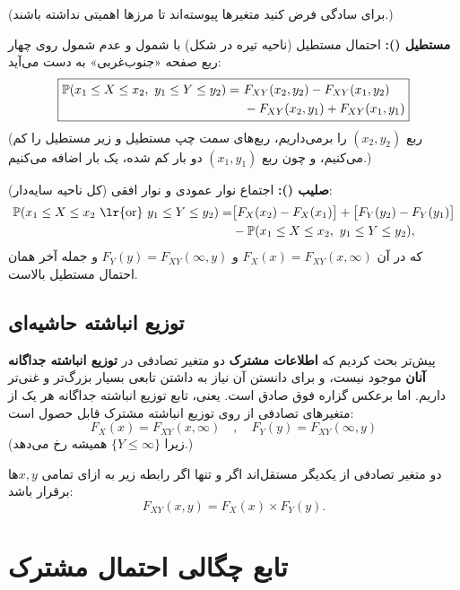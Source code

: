 \begin{question}[$\Prob(x_1\le X\le x_2\ ,\ y_1\le Y\le y_2)=\ ?$ و $\Prob(x_1\le X\le x_2\ \text{\lr{or}}\ y_1\le Y\le y_2)=\ ?$]
\begin{answer}
(برای سادگی فرض کنید متغیرها پیوسته‌اند تا مرزها اهمیتی نداشته باشند.)

\textbf{مستطیل ():} احتمال مستطیل (ناحیه تیره در شکل) با شمول و عدم شمول روی چهار ربع صفحه «جنوب‌غربی» به دست می‌آید:
\[
\boxed{\begin{aligned}\Prob(x_1\le X\le x_2,\ y_1\le Y\le y_2)=\ &F_{XY}(x_2,y_2)-F_{XY}(x_1,y_2)\\&-F_{XY}(x_2,y_1)+F_{XY}(x_1,y_1)\end{aligned}}
\]
(ربع $(x_2,y_2)$ را برمی‌داریم، ربع‌های سمت چپ مستطیل و زیر مستطیل را کم می‌کنیم، و چون ربع $(x_1,y_1)$ دو بار کم شده، یک بار اضافه می‌کنیم.)

\textbf{صلیب ():} اجتماع نوار عمودی و نوار افقی (کل ناحیه سایه‌دار):
\[
\begin{aligned}
\Prob(x_1\le X\le x_2\ \text{\lr{or}}\ y_1\le Y\le y_2)=&\big[F_X(x_2)-F_X(x_1)\big]+\big[F_Y(y_2)-F_Y(y_1)\big]\\
&-\Prob(x_1\le X\le x_2,\ y_1\le Y\le y_2),
\end{aligned}
\]
که در آن $F_X(x)=F_{XY}(x,\infty)$ و $F_Y(y)=F_{XY}(\infty,y)$ و جمله آخر همان احتمال مستطیل بالاست.
\end{answer}
\end{question}

\subsection{توزیع انباشته حاشیه‌ای }
پیش‌تر بحث کردیم که \textbf{اطلاعات مشترک} دو متغیر تصادفی در \textbf{توزیع انباشته جداگانه آنان} موجود نیست، و برای دانستن آن نیاز به داشتن تابعی بسیار بزرگ‌تر و غنی‌تر داریم. اما برعکس گزاره فوق صادق است. یعنی، تابع توزیع انباشته جداگانه هر یک از متغیرهای تصادفی از روی توزیع انباشته مشترک قابل حصول است:
\[
\boxed{\ F_X(x)=F_{XY}(x,\infty)\quad,\quad F_Y(y)=F_{XY}(\infty,y)\ }
\]
(زیرا $\{Y\le\infty\}$ همیشه رخ می‌دهد.)

\begin{theorem}
دو متغیر تصادفی از یکدیگر \textcolor{red!70!black}{مستقل}‌اند اگر و تنها اگر رابطه زیر به ازای تمامی $x,y$ها برقرار باشد:
\[
F_{XY}(x,y)=F_X(x)\times F_Y(y).
\]
\end{theorem}

\section{تابع چگالی احتمال مشترک }

